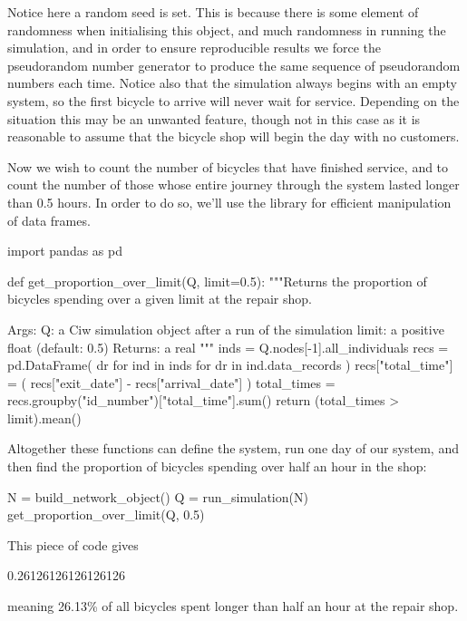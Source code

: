 Notice here a random seed is set. This is because there is some element of
randomness when initialising this object, and much randomness in running
the simulation, and in order to ensure reproducible
results we force the pseudorandom number generator to produce the same sequence
of pseudorandom numbers each time.
Notice also that the simulation always begins with an empty system, so the first
bicycle to arrive will never wait for service. Depending on the situation this
may be an unwanted feature, though not in this case as it is reasonable to
assume that the bicycle shop will begin the day with no customers.

Now we wish to count the number of bicycles that have finished service, and to
count the number of those whose entire journey through the system lasted longer
than 0.5 hours. In order to do so, we'll use the  library for
efficient manipulation of data frames.

\begin{pyin}
import pandas as pd

def get_proportion_over_limit(Q, limit=0.5):
    """Returns the proportion of bicycles spending
    over a given limit at the repair shop.
    
    Args:
        Q: a Ciw simulation object after a run of the
           simulation
        limit: a positive float (default: 0.5)   
    Returns:
        a real
    """
    inds = Q.nodes[-1].all_individuals
    recs = pd.DataFrame(
        dr for ind in inds for dr in ind.data_records
    )
    recs["total_time"] = (
        recs["exit_date"] - recs["arrival_date"]
    )
    total_times = recs.groupby("id_number")["total_time"].sum()
    return (total_times > limit).mean()
\end{pyin}

Altogether these functions can define the system, run one day of our system, and
then find the proportion of bicycles spending over half an hour in the shop:

\begin{pyin}
N = build_network_object()
Q = run_simulation(N)
get_proportion_over_limit(Q, 0.5)
\end{pyin}

This piece of code gives

\begin{pyout}
0.26126126126126126
\end{pyout}

meaning 26.13\% of all bicycles spent longer than half an hour at the repair
shop.

